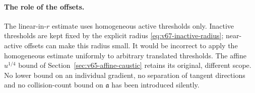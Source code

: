 \paragraph{The role of the offsets.}
The linear-in-$r$ estimate uses homogeneous active thresholds only.
Inactive thresholds are kept fixed by the explicit radius
\eqref{eq:v67-inactive-radius}; near-active offsets can make this
radius small. It would be incorrect to apply the homogeneous estimate
uniformly to arbitrary translated thresholds. The affine
$u^{1/4}$ bound of Section~\ref{sec:v65-affine-caustic} retains its
original, different scope. No lower bound on an individual gradient,
no separation of tangent directions and no collision-count bound on
$\mathfrak a$ has been introduced silently.
